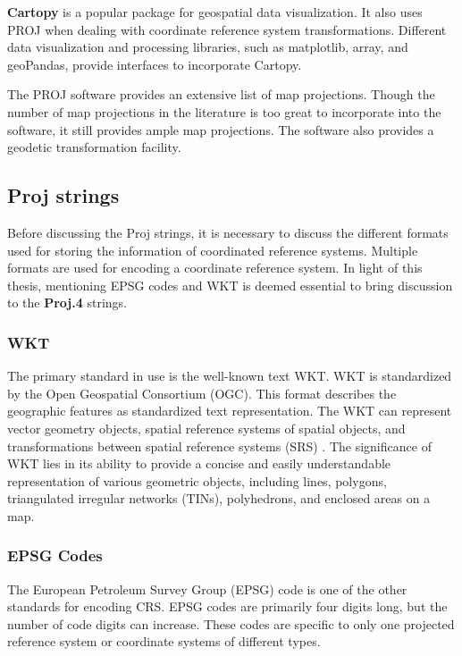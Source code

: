 \textbf{Cartopy} is a popular package for geospatial data visualization. It also uses PROJ when dealing with coordinate reference system transformations. Different data visualization and processing libraries, such as matplotlib, array, and geoPandas, provide interfaces to incorporate Cartopy.

The PROJ software provides an extensive list of map projections. Though the number of map projections in the literature is too great to incorporate into the software, it still provides ample map projections. The software also provides a geodetic transformation facility.

\subsection{Proj strings}
Before discussing the Proj strings, it is necessary to discuss the different formats used for storing the information of coordinated reference systems. Multiple formats are used for encoding a coordinate reference system. In light of this thesis, mentioning EPSG codes and WKT is deemed essential to bring discussion to the \textbf{Proj.4} strings.

\subsubsection*{WKT}
The primary standard in use is the well-known text WKT. WKT is standardized by the Open Geospatial Consortium (OGC)\cite{locWellknownText}. This format describes the geographic features as standardized text representation.
The WKT can represent vector geometry objects, spatial reference systems of spatial objects, and transformations between spatial reference systems (SRS) \cite{locWellknownText}.
The significance of WKT lies in its ability to provide a concise and easily understandable representation of various geometric objects, including lines, polygons, triangulated irregular networks (TINs), polyhedrons, and enclosed areas on a map\cite{locWellknownText}.

\subsubsection*{EPSG Codes}
The European Petroleum Survey Group (EPSG) code is one of the other standards for encoding CRS. EPSG codes are primarily four digits long, but the number of code digits can increase. These codes are specific to only one projected reference system or coordinate systems of different types.

